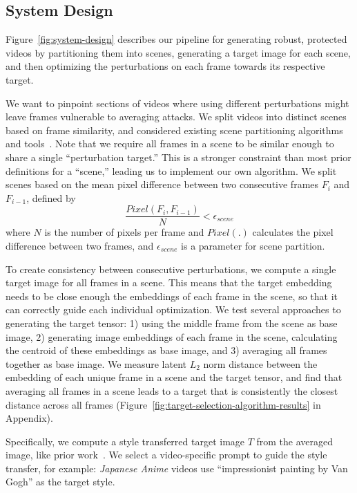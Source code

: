 \subsection{System Design}

Figure~\ref{fig:system-design} describes our pipeline for generating robust,
protected videos by partitioning them into scenes, generating a target image
for each scene, and then optimizing the perturbations on each frame towards
its respective target. 

  We want to pinpoint sections of videos where
using different perturbations might leave frames vulnerable to averaging
attacks. We split videos into distinct scenes based on frame similarity, and
considered existing scene partitioning algorithms and
tools~\cite{pyscenedetect}. Note that we require all frames in a scene to be
similar enough to share a single ``perturbation target.'' This is a stronger
constraint than most prior definitions for a ``scene,'' leading us to
implement our own algorithm. We split scenes based on the mean pixel
difference between two consecutive frames $F_i$ and $F_{i-1}$, defined
by \secspace
\begin{equation}
 \frac{Pixel(F_i, F_{i-1})}{N}< \epsilon_{scene}\label{eq:mean_pixel_diff}
\end{equation}
where $N$ is the number of pixels per frame and $Pixel(.)$ calculates
the pixel difference between two frames, and $\epsilon_{scene}$ is a
parameter for scene partition. 

  To create consistency between
consecutive perturbations, we compute a single target image for all frames in
a scene. This means that the target embedding needs to be close enough the
embeddings of each frame in the scene, so that it can correctly guide each
individual optimization. We test several approaches to generating the target
tensor: 1) using the middle frame from the scene as base image, 2) generating
image embeddings of each frame in the scene, calculating the centroid of
these embeddings as base image, and 3) averaging all frames together as base
image. We measure latent $L_2$ norm distance between the embedding of each unique frame in a
scene and the target tensor, and find that averaging all frames in a scene
leads to a target that is consistently the closest distance across all frames
(Figure~\ref{fig:target-selection-algorithm-results} in Appendix).

Specifically, we compute a style transferred target image $T$ from the averaged
image, like prior work~\cite{shan2023glaze}. We select a video-specific
prompt to guide the style transfer, for example: \textit{Japanese Anime} videos
use ``impressionist painting by Van Gogh'' as the target style.

